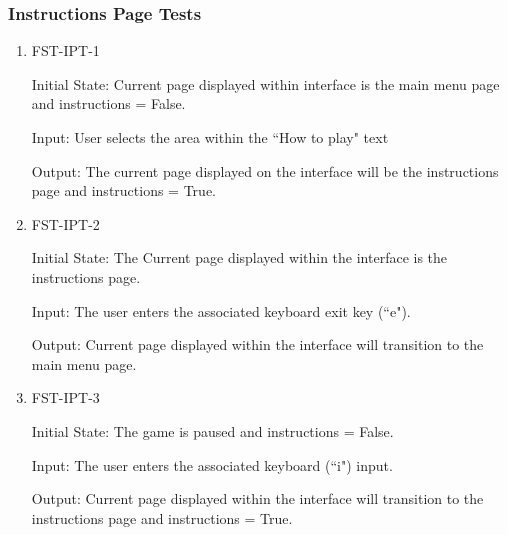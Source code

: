 \documentclass[12pt, titlepage]{article}
\begin{document}
	
		
	
	
	
	\subsubsection{Instructions Page Tests}
	
	\begin{enumerate}
		
		\item{FST-IPT-1\\}
		
		Initial State: Current page displayed within interface is the main menu page and instructions = False.
		
		Input: User selects the area within the ``How to play" text
		
		Output: The current page displayed on the interface will be the instructions page and instructions = True.
		
		\item{FST-IPT-2\\}
		
		Initial State: The Current page displayed within the interface is the instructions page.
		
		Input: The user enters the associated keyboard exit key (``e").
		
		Output: Current page displayed within the interface will transition to the main menu page.
		
		
		\item{FST-IPT-3\\}
		
		Initial State:  The game is paused and instructions = False.
		
		Input: The user enters the associated keyboard (``i") input.
		
		Output: Current page displayed within the interface will transition to the instructions page and instructions = True.
		
		
		
	\end{enumerate}
	
	
\end{document}
